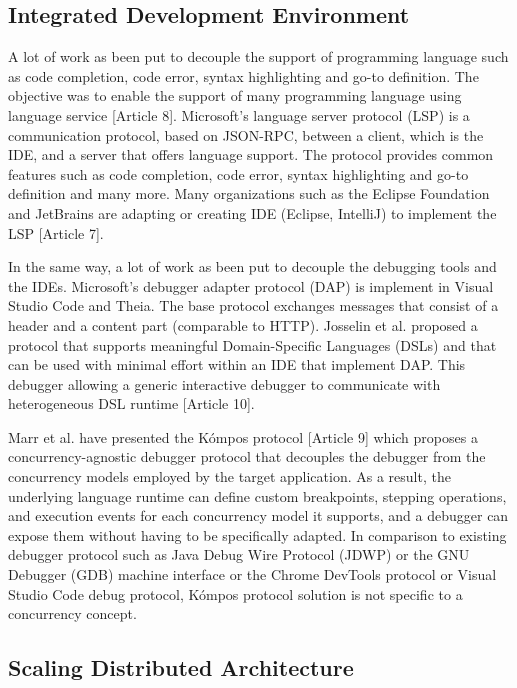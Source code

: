 \subsection{Integrated Development Environment}

A lot of work as been put to decouple the support of programming language such as code completion, code error, syntax highlighting and go-to definition. The objective was to enable the support of many programming language using language service [Article 8]. Microsoft's language server protocol (LSP) is a communication protocol, based on JSON-RPC, between a client, which is the IDE, and a server that offers language support. The protocol provides common features such as code completion, code error, syntax highlighting and go-to definition and many more. Many organizations such as the Eclipse Foundation and JetBrains are adapting or creating IDE (Eclipse, IntelliJ) to implement the LSP [Article 7]. 

In the same way, a lot of work as been put to decouple the debugging tools and the IDEs. Microsoft's debugger adapter protocol (DAP) is implement in Visual Studio Code and Theia. The base protocol exchanges messages that consist of a header and a content part (comparable to HTTP). Josselin et al. proposed a protocol that supports meaningful Domain-Specific Languages (DSLs) and that can be used with minimal effort within an IDE that implement DAP. This debugger allowing a generic interactive debugger to communicate with heterogeneous DSL runtime [Article 10]. 

Marr et al. have presented the Kómpos protocol [Article 9] which proposes a concurrency-agnostic debugger protocol that decouples the debugger from the concurrency models employed by the target application. As a result, the underlying language runtime can define custom breakpoints, stepping operations, and execution events for each concurrency model it supports, and a debugger can expose them without having to be specifically adapted. In comparison to existing debugger protocol such as Java Debug Wire Protocol (JDWP) or the GNU Debugger (GDB) machine interface or the Chrome DevTools protocol or Visual Studio Code debug protocol, Kómpos protocol solution is not specific to a concurrency concept.

\subsection{Scaling Distributed Architecture}

